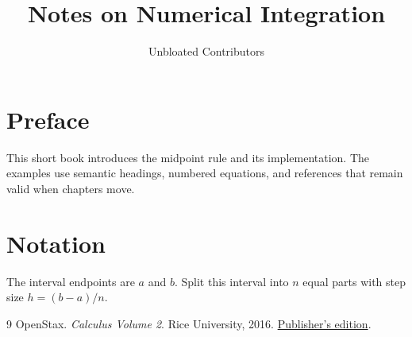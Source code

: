 \documentclass[11pt,a4paper]{unbloated-book}
\title{Notes on Numerical Integration}
\author{Unbloated Contributors}
\date{}
\begin{document}
\frontmatter
\maketitle
\tableofcontents

\chapter{Preface}
This short book introduces the midpoint rule and its implementation.
The examples use semantic headings, numbered equations, and references
that remain valid when chapters move.

\mainmatter



\appendix
\chapter{Notation}
\label{app:notation}
The interval endpoints are \(a\) and \(b\). Split this interval into
\(n\) equal parts with step size \(h=(b-a)/n\).

\backmatter
\begin{thebibliography}{9}
OpenStax.
\emph{Calculus Volume 2}.
Rice University, 2016.
\href{https://openstax.org/details/books/calculus-volume-2}{Publisher's edition}.
\end{thebibliography}
\end{document}
